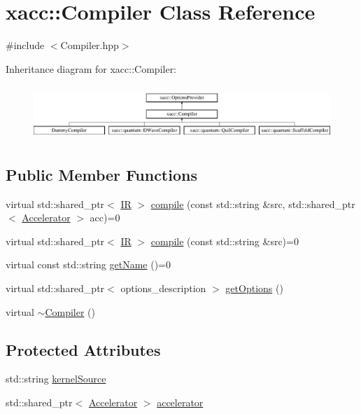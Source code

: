 \hypertarget{a02448}{}\section{xacc\+:\+:Compiler Class Reference}
\label{a02448}


{\ttfamily \#include $<$Compiler.\+hpp$>$}

Inheritance diagram for xacc\+:\+:Compiler\+:\begin{figure}[H]
\begin{center}
\leavevmode
\includegraphics[height=2.079208cm]{a02448}
\end{center}
\end{figure}
\subsection*{Public Member Functions}
\begin{DoxyCompactItemize}
\item 
virtual std\+::shared\+\_\+ptr$<$ \hyperlink{a02480}{IR} $>$ \hyperlink{a02448_a546a40c95bb93af6a0c0ac48dbeaffc8}{compile} (const std\+::string \&src, std\+::shared\+\_\+ptr$<$ \hyperlink{a02432}{Accelerator} $>$ acc)=0
\item 
virtual std\+::shared\+\_\+ptr$<$ \hyperlink{a02480}{IR} $>$ \hyperlink{a02448_a9092f5f779b570c91569b59621280c04}{compile} (const std\+::string \&src)=0
\item 
virtual const std\+::string \hyperlink{a02448_a87fca9100e6462122f5b687c3a0fb3fb}{get\+Name} ()=0
\item 
virtual std\+::shared\+\_\+ptr$<$ options\+\_\+description $>$ \hyperlink{a02448_a9f5a8965c9c2dd895016d18264ebbe92}{get\+Options} ()
\item 
virtual \hyperlink{a02448_a5d0b012687d9b44893872eaa81e47b38}{$\sim$\+Compiler} ()
\end{DoxyCompactItemize}
\subsection*{Protected Attributes}
\begin{DoxyCompactItemize}
\item 
std\+::string \hyperlink{a02448_a0ad81c816c09e5113d03cdc02165c453}{kernel\+Source}
\item 
std\+::shared\+\_\+ptr$<$ \hyperlink{a02432}{Accelerator} $>$ \hyperlink{a02448_ad4cbb467fa7e377bac6c054ffcb22b7c}{accelerator}
\end{DoxyCompactItemize}


